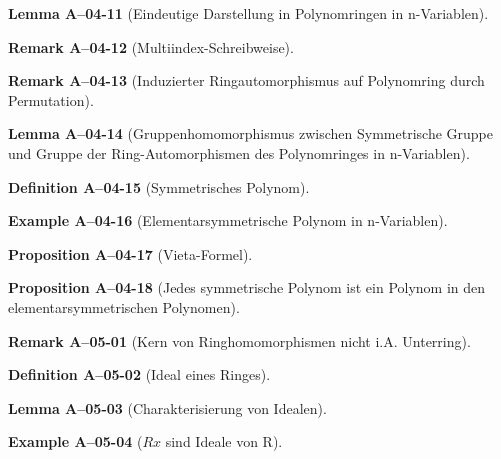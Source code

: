 \documentclass[10pt, letterpaper]{article}
\newcommand{\CustomHeading}[3]{%
  \par\medskip\noindent%
  \textbf{#1 #2} \textnormal{(#3)}.\enskip%
}
\newenvironment{DEF}[2]{\CustomHeading{Definition}{#1}{#2}}{}
\newenvironment{PROP}[2]{\CustomHeading{Proposition}{#1}{#2}}{}
\newenvironment{LEM}[2]{\CustomHeading{Lemma}{#1}{#2}}{}
\newenvironment{REM}[2]{\CustomHeading{Remark}{#1}{#2}}{}
\newenvironment{EXA}[2]{\CustomHeading{Example}{#1}{#2}}{}
\begin{document}
\begin{LEM}{A--04-11}{Eindeutige Darstellung in Polynomringen in n-Variablen}
\end{LEM}

\begin{REM}{A--04-12}{Multiindex-Schreibweise}
\end{REM}

\begin{REM}{A--04-13}{Induzierter Ringautomorphismus auf Polynomring durch Permutation}
\end{REM}

\begin{LEM}{A--04-14}{Gruppenhomomorphismus zwischen Symmetrische Gruppe und Gruppe der Ring-Automorphismen des Polynomringes in n-Variablen}
\end{LEM}

\begin{DEF}{A--04-15}{Symmetrisches Polynom}
\end{DEF}

\begin{EXA}{A--04-16}{Elementarsymmetrische Polynom in n-Variablen}
\end{EXA}

\begin{PROP}{A--04-17}{Vieta-Formel}
\end{PROP}

\begin{PROP}{A--04-18}{Jedes symmetrische Polynom ist ein Polynom in den elementarsymmetrischen Polynomen}
\end{PROP}

\begin{REM}{A--05-01}{Kern von Ringhomomorphismen nicht i.A. Unterring}
\end{REM}

\begin{DEF}{A--05-02}{Ideal eines Ringes}
\end{DEF}

\begin{LEM}{A--05-03}{Charakterisierung von Idealen}
\end{LEM}

\begin{EXA}{A--05-04}{$Rx$ sind Ideale von R}
\end{EXA}
\end{document}
